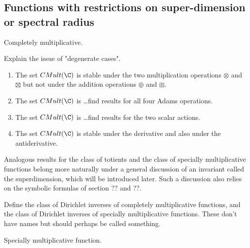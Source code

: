 \subsection{Functions with restrictions on super-dimension or spectral radius}



\begin{definition}
Completely multiplicative.
\end{definition}

\begin{remark}
Explain the issue of "degenerate cases".
\end{remark}

\begin{proposition}
\begin{enumerate}
\item The set $CMult(\C)$ is stable under the two multiplication operations $\otimes$ and $\boxtimes$ but not under the addition operations $\oplus$ and $\boxplus$.
\item The set $CMult(\C)$ is \ldots find results for all four Adams operations.
\item The set $CMult(\C)$ is \ldots find results for the two scalar actions.
\item The set $CMult(\C)$ is stable under the derivative and also under the antiderivative.
\end{enumerate}
\end{proposition}

Analogous results for the class of totients and the class of specially multiplicative functions belong more naturally under a general discussion of an invariant called the superdimension, which will be introduced later. Such a discussion also relies on the symbolic formulas of section ?? and ??.




\begin{remark}
Define the class of Dirichlet inverses of completely multiplicative functions, and the class of Dirichlet inverses of specially multiplicative functions. These don't have names but should perhaps be called something.
\end{remark}



\begin{definition}
Specially multiplicative function.
\end{definition}

